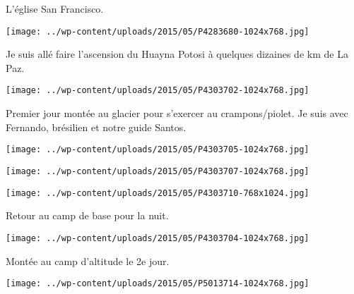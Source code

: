  

 L'église San Francisco. 

 

\begin{center} \texttt{[image: ../wp-content/uploads/2015/05/P4283680-1024x768.jpg]} \end{center}

 

 Je suis allé faire l'ascension du Huayna Potosi à quelques dizaines de km de La Paz. 

 

\begin{center} \texttt{[image: ../wp-content/uploads/2015/05/P4303702-1024x768.jpg]} \end{center}

 

 Premier jour montée au glacier pour s'exercer au crampons/piolet. Je suis avec Fernando, brésilien et notre guide Santos. 

 

\begin{center} \texttt{[image: ../wp-content/uploads/2015/05/P4303705-1024x768.jpg]} \end{center}

 

 

\begin{center} \texttt{[image: ../wp-content/uploads/2015/05/P4303707-1024x768.jpg]} \end{center}

 

 

\begin{center} \texttt{[image: ../wp-content/uploads/2015/05/P4303710-768x1024.jpg]} \end{center}

 

 Retour au camp de base pour la nuit. 

 

\begin{center} \texttt{[image: ../wp-content/uploads/2015/05/P4303704-1024x768.jpg]} \end{center}

 

 Montée au camp d'altitude le 2e jour. 

 

\begin{center} \texttt{[image: ../wp-content/uploads/2015/05/P5013714-1024x768.jpg]} \end{center}

